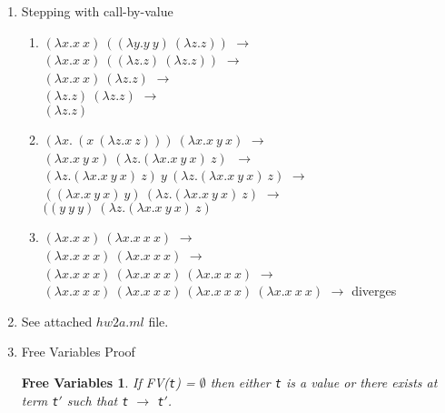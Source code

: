 \documentclass{article}
\newtheorem{free}{Free Variables}
\begin{document}
\begin{description}
\begin{enumerate}
\begin{enumerate}
    \end{enumerate}

  \item{Stepping with call-by-value}
    \begin{enumerate}
    \item $(\lambda x.x\ x)\ ((\lambda y.y\ y)\ (\lambda z.z))$ $\longrightarrow$ \\
          $(\lambda x.x\ x)\ ((\lambda z.z)\ (\lambda z.z))$ $\longrightarrow$ \\
          $(\lambda x.x\ x)\ (\lambda z.z)$ $\longrightarrow$ \\
          $(\lambda z.z)\ (\lambda z.z)$ $\longrightarrow$ \\
          $(\lambda z.z)$

    \item $(\lambda x.\ (x\ (\lambda z.x\ z)))\ (\lambda x.x\ y\ x)$ $\longrightarrow$ \\
          $(\lambda x.x\ y\ x)\ (\lambda z.(\lambda x.x\ y\ x)\ z)\ $
$\longrightarrow$  \\
          $(\lambda z.(\lambda x.x\ y\ x)\ z)\ y\ (\lambda z.(\lambda x.x\ y\ x)\ z)$
$\longrightarrow$  \\
          $((\lambda x.x\ y\ x)\ y)\ (\lambda z.(\lambda x.x\ y\ x)\ z)$
$\longrightarrow$  \\
          $((y\ y\ y)\ (\lambda z.(\lambda x.x\ y\ x)\ z)$

          \newpage

    \item $(\lambda x.x\ x)\ (\lambda x.x\ x\ x)$ $\longrightarrow$ \\
          $(\lambda x.x\ x\ x)\ (\lambda x.x\ x\ x)$ $\longrightarrow$ \\
          $(\lambda x.x\ x\ x)\ (\lambda x.x\ x\ x)\ (\lambda x.x\ x\ x)$
$\longrightarrow$ \\
          $(\lambda x.x\ x\ x)\ (\lambda x.x\ x\ x)\ (\lambda x.x\ x\ x)\ (\lambda x.x\ x\ x)$ $\longrightarrow$ diverges


    \end{enumerate}

  \item{See attached $hw2a.ml$ file.}

  \item{Free Variables Proof}
    \begin{free}
      If FV(\verb|t|) = $\emptyset$ then either \verb|t| is a value or there exists at term \verb|t|$'$ such that \verb|t| $\longrightarrow$ \verb|t|$'$.
    \end{free}


\end{enumerate}
\end{description}
\end{document}
